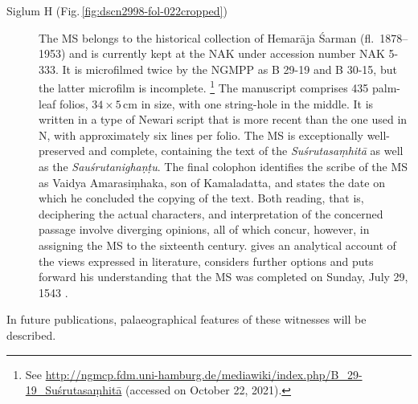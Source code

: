 \begin{description}
\goodbreak
\item[Siglum H (Fig.\,\ref{fig:dscn2998-fol-022cropped})] The MS belongs to the historical 
collection of Hemarāja Śarman (fl.\ 
1878--1953) and is currently kept at the NAK under accession number NAK 5-333. It is 
microfilmed twice by the NGMPP as B 29-19 and B 30-15, but the latter microfilm is 
incomplete.%
    \footnote{%
    See 
    \url{http://ngmcp.fdm.uni-hamburg.de/mediawiki/index.php/B_29-19_Suśrutasaṃhitā}
     (accessed on October 22, 2021).
    } 
The manuscript comprises 435 palm-leaf folios,  $34\times5$\,cm in size, with one string-hole 
in the 
middle. It is written in a type of Newari script that is more recent than the one used in N, with 
approximately six lines per folio. The MS is exceptionally well-preserved and complete, 
containing the text of the \emph{Suśrutasaṃhitā} as well as the \emph{Sauśrutanighaṇṭu}. 
The final colophon identifies the scribe of the MS as Vaidya Amarasiṃhaka, son of 
Kamaladatta, and states the date on which he concluded the copying of the text. Both 
reading, that is, deciphering the actual characters, and interpretation of the concerned 
passage involve diverging opinions, all of which concur, however, in assigning the MS to the 
sixteenth century. \textcites[21--26]{kleb-2021b} gives an analytical account of the views 
expressed in literature, considers further options and puts forward his understanding that the 
MS was completed on Sunday, July 29, 1543 \CE.  
\end{description}
  
In future publications, palaeographical features of these 
witnesses will be described.

